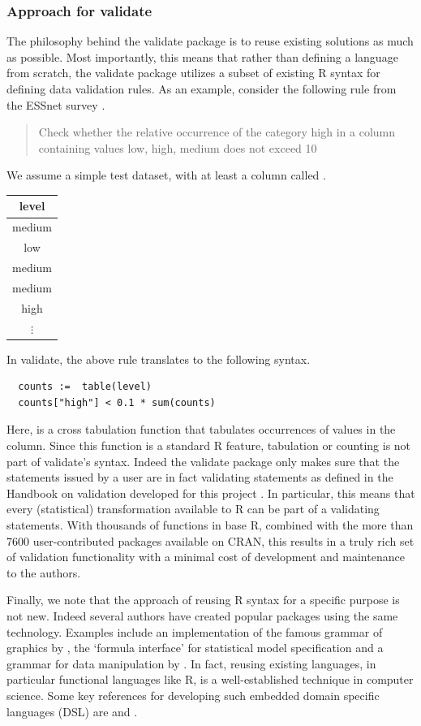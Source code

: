 \subsubsection{Approach for validate}
The philosophy behind the validate package is to reuse existing solutions as
much as possible. Most importantly, this means that rather than defining a
language from scratch, the validate package utilizes a subset of existing R
syntax for defining data validation rules. As an example, consider the following rule from the ESSnet survey \citep{walsdorfer:2015}.
\begin{quote}
Check whether the relative occurrence of the category high in a column
containing values low, high, medium does not exceed 10%
\end{quote}
We assume a simple test dataset, with at least a column called .
\begin{center}
\begin{tabular}{|c|}
\hline
\textbf{level}\\
\hline
medium\\
\hline
low\\
\hline
medium\\
\hline
medium\\
\hline
high\\
\hline
$\vdots$\\
\hline
\end{tabular}
\end{center}
In validate, the above rule translates to the following syntax.
\begin{verbatim}
  counts :=  table(level)
  counts["high"] < 0.1 * sum(counts)
\end{verbatim}
Here,  is a cross tabulation function that tabulates occurrences
of values in the  column. Since this function is a standard R
feature, tabulation or counting is not part of validate's syntax. Indeed the
validate package only makes sure that the statements issued by a user are in
fact validating statements as defined in the Handbook on validation developed
for this project \citep{zio:2015}. In particular, this means that every
(statistical) transformation available to R can be part of a validating
statements.  With thousands of functions in base R, combined with the more than
7600 user-contributed packages available on CRAN, this results in a truly rich
set of validation functionality with a minimal cost of development and
maintenance to the authors.

Finally, we note that the approach of reusing R syntax for a specific purpose
is not new. Indeed several authors have created popular packages using the same
technology. Examples include an implementation of the famous grammar of
graphics \citep{wilkinson:2006} by \citet{wickham:2014}, the  `formula
interface' for statistical model specification and a grammar for data
manipulation by \cite{wickham:2014}. In fact, reusing existing languages, in
particular functional languages like R, is a well-established technique in
computer science.  Some key references for developing such embedded domain
specific languages (DSL) are \cite{fowler:2011} and \cite{gibbons:2015}.


